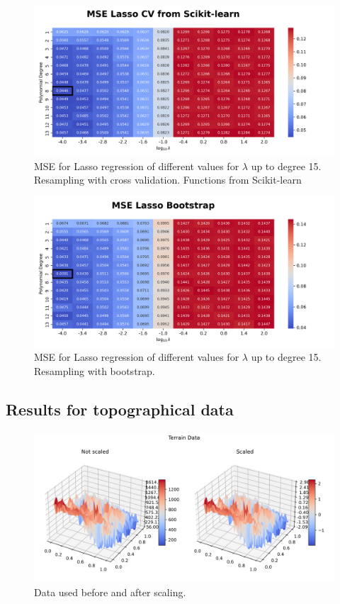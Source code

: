 \documentclass{article}
\begin{document}
\begin{figure}[htbp]
    \centering
    \includegraphics[width=\textwidth]{Project1/figures/Franke/Heatmap_MSE_Lasso_CV_from_Scikit-learn.png}
    \caption{MSE for Lasso regression of different values for $\lambda$ up to degree 15. Resampling with cross validation. Functions from Scikit-learn}
    \label{fig:LassoCVsklearn}
\end{figure}

\begin{figure}[htbp]
    \centering
    \includegraphics[width=\textwidth]{Project1/figures/Franke/Heatmap_MSE_Lasso_Bootstrap.png}
    \caption{MSE for Lasso regression of different values for $\lambda$ up to degree 15. Resampling with bootstrap.}
    \label{fig:LassoBootstrap}
\end{figure}


\newpage
\subsection{Results for topographical data}
\begin{figure}[htbp]
    \centering
    \includegraphics[width=\textwidth]{Project1/figures/Terrain/TerrainFigure.png}
    \caption{Data used before and after scaling.}
    \label{fig:TerrainFig}
\end{figure}
\end{document}
